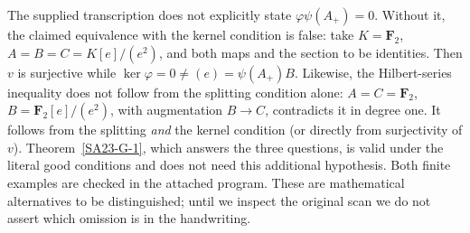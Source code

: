 \begin{remark}\label{SA23-G-4}
The supplied transcription does not explicitly state
$\varphi\psi(A_+)=0$.  Without it, the claimed equivalence with the
kernel condition is false: take $K=\mathbf F_2$,
$A=B=C=K[e]/(e^2)$, and both maps and the section to be identities.
Then $v$ is surjective while
$\ker\varphi=0\ne(e)=\psi(A_+)B$.
Likewise, the Hilbert-series inequality does not follow from the
splitting condition alone: $A=C=\mathbf F_2$, $B=\mathbf F_2[e]/(e^2)$, with augmentation
$B\to C$, contradicts it in degree one.  It follows from the splitting
\emph{and} the kernel condition (or directly from surjectivity of $v$).
Theorem~\ref{SA23-G-1}, which answers the three questions, is valid under
the literal good conditions and does not need this additional hypothesis.
Both finite examples are checked in the attached program.
These are mathematical alternatives to be distinguished; until we
inspect the original scan we do not assert which omission is in the
handwriting.
\end{remark}
